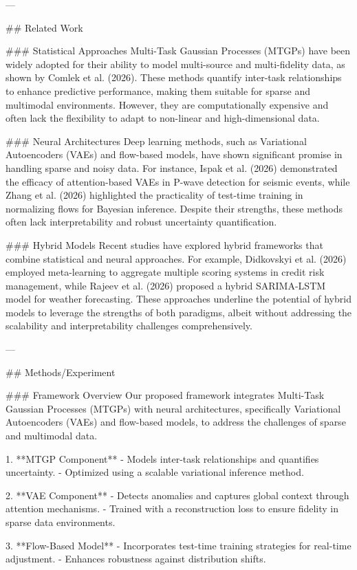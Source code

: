 ---

## Related Work  

### Statistical Approaches  
Multi-Task Gaussian Processes (MTGPs) have been widely adopted for their ability to model multi-source and multi-fidelity data, as shown by Comlek et al. (2026). These methods quantify inter-task relationships to enhance predictive performance, making them suitable for sparse and multimodal environments. However, they are computationally expensive and often lack the flexibility to adapt to non-linear and high-dimensional data.  

### Neural Architectures  
Deep learning methods, such as Variational Autoencoders (VAEs) and flow-based models, have shown significant promise in handling sparse and noisy data. For instance, Ispak et al. (2026) demonstrated the efficacy of attention-based VAEs in P-wave detection for seismic events, while Zhang et al. (2026) highlighted the practicality of test-time training in normalizing flows for Bayesian inference. Despite their strengths, these methods often lack interpretability and robust uncertainty quantification.  

### Hybrid Models  
Recent studies have explored hybrid frameworks that combine statistical and neural approaches. For example, Didkovskyi et al. (2026) employed meta-learning to aggregate multiple scoring systems in credit risk management, while Rajeev et al. (2026) proposed a hybrid SARIMA-LSTM model for weather forecasting. These approaches underline the potential of hybrid models to leverage the strengths of both paradigms, albeit without addressing the scalability and interpretability challenges comprehensively.

---

## Methods/Experiment  

### Framework Overview  
Our proposed framework integrates Multi-Task Gaussian Processes (MTGPs) with neural architectures, specifically Variational Autoencoders (VAEs) and flow-based models, to address the challenges of sparse and multimodal data.  

1. **MTGP Component**  
   - Models inter-task relationships and quantifies uncertainty.
   - Optimized using a scalable variational inference method.

2. **VAE Component**  
   - Detects anomalies and captures global context through attention mechanisms.
   - Trained with a reconstruction loss to ensure fidelity in sparse data environments.

3. **Flow-Based Model**  
   - Incorporates test-time training strategies for real-time adjustment.
   - Enhances robustness against distribution shifts.

